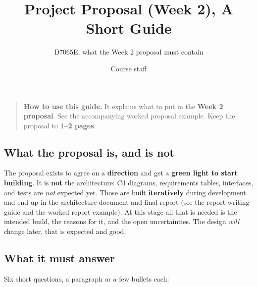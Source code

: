 \documentclass[
  11pt,
]{article}
\title{Project Proposal (Week 2), A Short Guide}
\subtitle{D7065E, what the Week 2 proposal must contain}
\author{Course staff}
\date{}
\begin{document}
\maketitle

\begin{quote}
\textbf{How to use this guide.} It explains what to put in the
\textbf{Week 2 proposal}. See the accompanying worked proposal example.
Keep the proposal to \textbf{1--2 pages}.
\end{quote}

\hypertarget{what-the-proposal-is-and-is-not}{%
\subsection{What the proposal is, and is
not}\label{what-the-proposal-is-and-is-not}}

The proposal exists to agree on a \textbf{direction} and get a
\textbf{green light to start building}. It is \textbf{not} the
architecture: C4 diagrams, requirements tables, interfaces, and tests are
\emph{not} expected yet. Those are built \textbf{iteratively} during
development and end up in the architecture document and final report (see
the report-writing guide and the worked report example). At this stage
all that is needed is the intended build, the reasons for it, and the
open uncertainties. The design \emph{will} change later, that is
expected and good.

\hypertarget{what-it-must-answer}{%
\subsection{What it must answer}\label{what-it-must-answer}}

Six short questions, a paragraph or a few bullets each:
\end{document}
